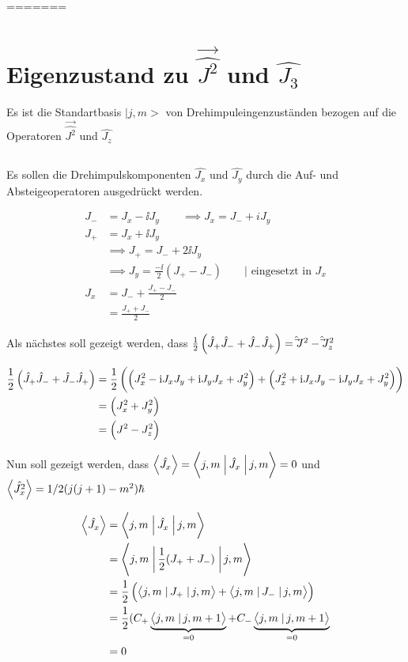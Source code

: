 =======

\section{Eigenzustand zu $\vec{\hat{J^2}}$ und $\hat{J_3}$}
Es ist die Standartbasis $|j,m>$ von Drehimpuleingenzuständen bezogen auf die Operatoren $\vec{\hat{J^2}}$ und $\hat{J_z}$

\subsection{}
Es sollen die Drehimpulskomponenten $\hat{J_x}$ und $\hat{J_y}$ durch die Auf- und Absteigeoperatoren ausgedrückt werden.

\begin{align*}
    J_- &= J_x-\ii J_y \qquad \implies J_x= J_- +iJ_y \\
    J_+ &= J_x+\ii J_y \\
    &\implies J_+ = J_-+2\ii J_y \\
    &\implies J_y = \frac{-\ii}{2}(J_+-J_-) \qquad |\text{ eingesetzt in }J_x\\
    J_x &= J_-+\frac{J_+-J_-}{2} \\
        &= \frac{J_++J_-}{2}
\end{align*}

Als nächstes soll gezeigt werden, dass $\frac 12\del{\hat J_+\hat J_-+\hat J_-\hat J_+}=\hat\vec J^2-\hat\vec J_z^2$

\begin{align*}
    \frac 12\del{\hat J_+\hat J_-+\hat J_-\hat J_+} &= \frac 12\del{\del{J_x^2-\ii J_xJ_y+\ii J_yJ_x+J_y^2}+\del{J_x^2+\ii J_xJ_y-\ii J_yJ_x+J_y^2}} \\
                                                    &=\del{J_x^2+J_y^2} \\
                                                    &=\del{J^2-J_z^2}
\end{align*}

Nun soll gezeigt werden, dass $\mw{\hat{J_x}}=\braopket{j,m}{\hat J_x}{j,m} = 0$ und $\left\langle\hat{J_x^2}\right\rangle=1/2(j(j+1)-m^2)\hbar$

\begin{align*}
    \mw{\hat{J_x}} &= \braopket{j,m}{\hat{J_x}}{j,m} \\
                   &= \braopket{j,m}{\frac 12(J_++J_-)}{j,m} \\
                   &= \frac 12\del{\braopket{j,m}{J_+}{j,m} + \braopket{j,m}{J_-}{j,m}} \\
                   &= \frac 12 (C_+\underbrace{\braket{j,m}{j,m+1}}_{=0}+C_-\underbrace{\braket{j,m}{j,m+1}}_{=0} \\
                &=0
\end{align*}

